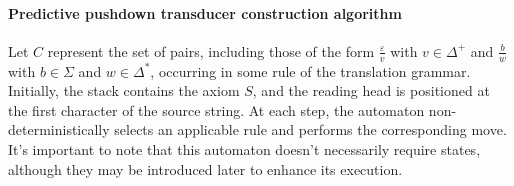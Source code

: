 \paragraph*{Predictive pushdown transducer construction algorithm}
Let $C$ represent the set of pairs, including those of the form $\frac{\varepsilon}{v}$ with $v \in \Delta^+$ and $\frac{b}{w}$ with $b \in \Sigma$ and $w \in \Delta^{*}$, occurring in some rule of the translation grammar. 
Initially, the stack contains the axiom $S$, and the reading head is positioned at the first character of the source string. 
At each step, the automaton non-deterministically selects an applicable rule and performs the corresponding move. 
It's important to note that this automaton doesn't necessarily require states, although they may be introduced later to enhance its execution.
\begin{table}[H]
    \centering
\end{table}
